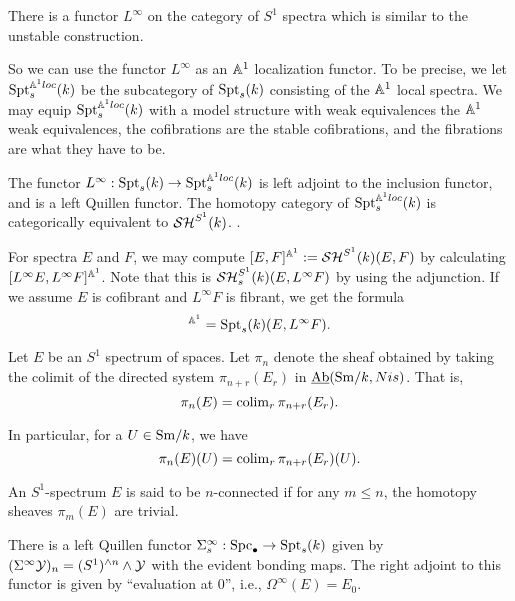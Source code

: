 \documentclass{amsart}%
\begin{document}
\begin{remark}
  There is a functor $L^{\infty}$ on the category of $S^1$ spectra
  which is similar to the unstable construction.

  So we can use the functor $L^{\infty}$ as an $\mathbb{A}^1$ localization
  functor. To be precise, we let $\mathrm{Spt}_s^{\mathbb{A}^1loc}(k)$ be the
  subcategory of $\mathrm{Spt}_s(k)$ consisting of the $\mathbb{A}^1$ local
  spectra. We may equip $\mathrm{Spt}_s^{\mathbb{A}^1loc}(k)$ with a model structure
  with weak equivalences the $\mathbb{A}^1$ weak equivalences, the
  cofibrations are the stable cofibrations, and the fibrations are
  what they have to be.

  The functor $L^{\infty} : \mathrm{Spt}_s(k) \to \mathrm{Spt}_s^{\mathbb{A}^1loc}(k)$ is
  left adjoint to the inclusion functor, and is a left Quillen
  functor. The homotopy category of $\mathrm{Spt}_s^{\mathbb{A}^1loc}(k)$ is
  categorically equivalent to $\mathcal{SH}^{S^1}(k)$. \cite[Corollary
  4.2.3]{Mor05}.

  For spectra $E$ and $F$, we may compute
  $[E,F]^{\mathbb{A}^1}:= \mathcal{SH}^{S^1}(k)(E,F)$ by calculating
  $[L^{\infty} E, L^{\infty} F]^{\mathbb{A}^1}$. Note that this is
  $\mathcal{SH}^{S^1}_s(k)(E,L^{\infty}F)$ by using the adjunction. If we
  assume $E$ is cofibrant and $L^{\infty}F$ is fibrant, we get the
  formula
  \begin{equation*}
    [E,F]^{\bbA^1} = \Spt_s(k)(E,L^{\infty}F).
  \end{equation*}
\end{remark}

\begin{definition}
  Let $E$ be an $S^1$ spectrum of spaces. Let $\pi_n$ denote the sheaf
  obtained by taking the colimit of the directed system
  $\pi_{n+r}(E_r)$ in $\operatorname{\underline{Ab}}(\mathrm{Sm}/k,Nis)$. That is,
  \begin{equation*}
    \pi_n(E) = \operatorname{colim}_{r} \pi_{n+r}(E_r). 
  \end{equation*}

  In particular, for a $U \in \mathrm{Sm}/k$, we have 
  \begin{equation*}
    \pi_n(E)(U) = \operatorname{colim}_{r} \pi_{n+r}(E_r)(U).
  \end{equation*}
\end{definition}

\begin{definition}
  An $S^1$-spectrum $E$ is said to be $n$-connected if for any
  $m\leq n$, the homotopy sheaves $\pi_m(E)$ are trivial.
\end{definition}

\begin{definition}
  There is a left Quillen functor
  $\Sigma^{\infty}_s : \mathrm{Spc}_{\bullet} \to \mathrm{Spt}_s(k)$ given by
  $(\Sigma^{\infty}\mathcal{Y})_n =(S^1)^{\wedge n} \wedge \mathcal{Y}$ with the
  evident bonding maps. The right adjoint to this functor is given by
  ``evaluation at $0$'', i.e., $\Omega^{\infty}(E) = E_0$.
\end{definition}
\end{document}
